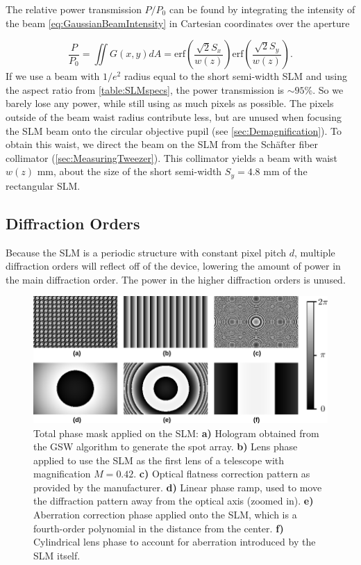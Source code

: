 \noindent The relative power transmission $P/P_0$ can be found by integrating the intensity of the beam \cref{eq:GaussianBeamIntensity} in Cartesian coordinates over the aperture

\begin{equation}\label{eq:RectAperturePower}
	\frac{P}{P_0} =
	\iint G(x,y) dA=
	\text{erf}\left(\frac{\sqrt{2}S_x}{w(z)}\right) \text{erf}\left(\frac{\sqrt{2}S_y}{w(z)}\right).
\end{equation}
If we use a beam with $1/e^2$ radius equal to the short semi-width SLM and using the aspect ratio from \cref{table:SLMspecs}, the power transmission is $\sim 95$\%.
So we barely lose any power, while still using as much pixels as possible.
The pixels outside of the beam waist radius contribute less, but are unused when focusing the SLM beam onto the circular objective pupil (see \cref{sec:Demagnification}).
To obtain this waist, we direct the beam on the SLM from the Schäfter fiber collimator (\cref{sec:MeasuringTweezer}).
This collimator yields a beam with waist $w(z)$ mm, about the size of the short semi-width $S_y = 4.8$ mm of the rectangular SLM.




\subsection{Diffraction Orders}\label{subsec:Diffraction}

Because the SLM is a periodic structure with constant pixel pitch $d$, multiple diffraction orders will reflect off of the device, lowering the amount of power in the main diffraction order.
The power in the higher diffraction orders is unused. 

\begin{figure}
	\centering
	\includegraphics[width=\textwidth]{figures/hologram.png}
	\caption{
		Total phase mask applied on the SLM: \textsf{\textbf{a)}} Hologram obtained from the \ac{GSW} algorithm to generate the spot array.
		\textsf{\textbf{b)}} Lens phase applied to use the SLM as the first lens of a telescope with magnification $M=0.42$.
		\textsf{\textbf{c)}} Optical flatness correction pattern as provided by the manufacturer.
		\textsf{\textbf{d)}} Linear phase ramp, used to move the diffraction pattern away from the optical axis (zoomed in).
		\textsf{\textbf{e)}} Aberration correction phase applied onto the SLM, which is a fourth-order polynomial in the distance from the center.
		\textsf{\textbf{f)}} Cylindrical lens phase to account for aberration introduced by the SLM itself.
	}
	\label{fig:SLMphase}
\end{figure}

